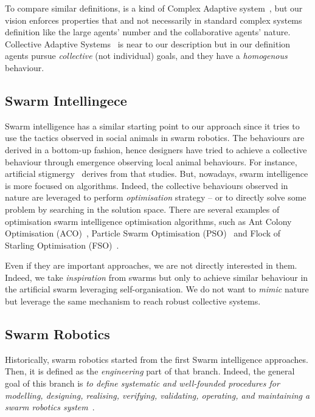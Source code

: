 \documentclass[11pt]{article}
\begin{document}
To compare similar definitions, \cpsw{} is a kind of Complex Adaptive system~\cite{holland1992complex}, but our vision enforces properties that and not necessarily in standard complex systems definition like the large agents' number and the collaborative agents' nature.
Collective Adaptive Systems~\cite{DBLP:journals/corr/abs-1108-5643} is near to our \cpsw{} description but in our definition agents pursue \emph{collective} (not individual) goals, and they have a \emph{homogenous} behaviour.
\subsection{Swarm Intellingece}
Swarm intelligence has a similar starting point to our approach since it tries to use the tactics observed in social animals in swarm robotics. The behaviours are derived in a bottom-up fashion, hence designers have tried to achieve a collective behaviour through emergence observing local animal behaviours.
%
For instance, artificial stigmergy~\cite{DBLP:journals/fgcs/DorigoBT00} derives from that studies. But, nowadays, swarm intelligence is more focused on algorithms. 
Indeed, the collective behaviours observed in nature are leveraged to perform \textit{optimisation} strategy -- or to directly solve some problem by searching in the solution space.
There are several examples of optimisation swarm intelligence optimisation algorithms,  such as Ant Colony Optimisation (ACO)~\cite{DBLP:journals/tsmc/DorigoMC96}, Particle Swarm Optimisation (PSO)~\cite{DBLP:conf/icnn/KennedyE95} and Flock of Starling Optimisation (FSO)~\cite{DBLP:series/sci/FulgineiS11}.

Even if they are important approaches, we are not directly interested in them. Indeed, we take \textit{inspiration} from swarms but only to achieve similar behaviour in the artificial swarm leveraging self-organisation. We do not want to \textit{mimic} nature but leverage the same mechanism to reach robust collective systems.
\subsection{Swarm Robotics}
Historically, swarm robotics started from the first Swarm intelligence approaches. Then, it is defined as the \textit{engineering} part of that branch. Indeed, the general goal of this branch is \emph{to define systematic and well-founded procedures for modelling, designing, realising, verifying, validating, operating, and maintaining a swarm robotics system}~\cite{DBLP:journals/swarm/BrambillaFBD13}.
\end{document}
